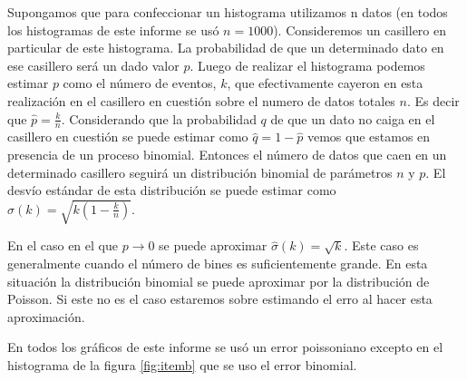 \documentclass{article}
\begin{document}
Supongamos que para confeccionar un histograma utilizamos n datos (en todos los histogramas de este informe se usó $n=1000$).
Consideremos un casillero en particular de este histograma.
La probabilidad de que un determinado dato en ese casillero será un dado valor $p$.
Luego de realizar el histograma podemos estimar $p$ como el número de eventos, $k$, que efectivamente cayeron en esta realización en el casillero en cuestión sobre el numero de datos totales $n$.
Es decir que $\hat p = \frac{k}{n}$.
Considerando que la probabilidad $q$ de que un dato no caiga en el casillero en cuestión se puede estimar como $\hat q = 1 - \hat p$ vemos que estamos en presencia de un proceso binomial.
Entonces el número de datos que caen en un determinado casillero seguirá un distribución binomial de parámetros $n$ y $p$.
El desvío estándar de esta distribución se puede estimar como $\hat \sigma(k) = \sqrt{k (1 - \frac{k}{n})}$.

En el caso en el que $p\rightarrow 0$ se puede aproximar $\hat \sigma(k) = \sqrt{k}$.
Este caso es generalmente cuando el número de bines es suficientemente grande.
En esta situación la distribución binomial se puede aproximar por la distribución de Poisson.
Si este no es el caso estaremos sobre estimando el erro al hacer esta aproximación.


En todos los gráficos de este informe se usó un error poissoniano excepto en el histograma de la figura \ref{fig:itemb} que se uso el error binomial.
\end{document}
